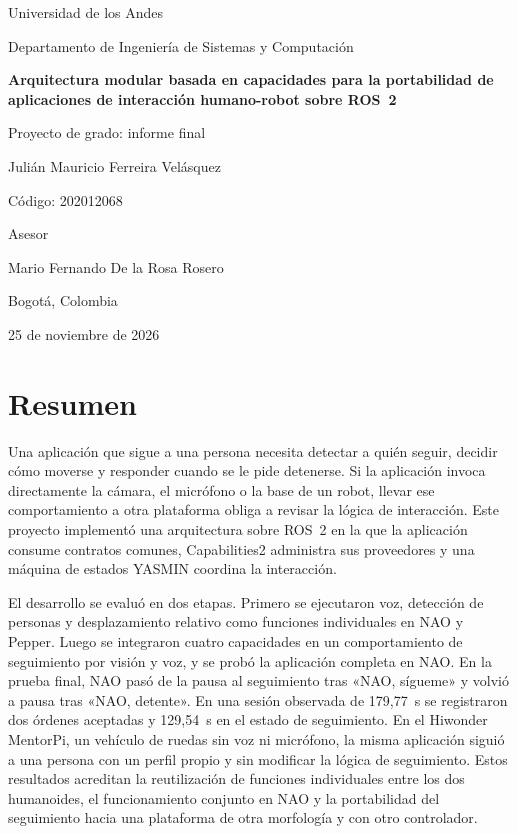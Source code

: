 \documentclass[11pt,letterpaper]{article}
\begin{document}
\hypersetup{pageanchor=false}
\begin{titlepage}
\centering
{\Large Universidad de los Andes\par}
Departamento de Ingeniería de Sistemas y Computación\par
\vspace{2cm}
{\LARGE\bfseries Arquitectura modular basada en capacidades para la portabilidad de aplicaciones de interacción humano-robot sobre ROS~2\par}
\vspace{1.2cm}
{\Large Proyecto de grado: informe final\par}
\vspace{1.5cm}
{\large Julián Mauricio Ferreira Velásquez\par}
Código: 202012068\par
\vspace{1cm}
Asesor\par
{\large Mario Fernando De la Rosa Rosero\par}
\vfill
Bogotá, Colombia\par
25 de noviembre de 2026\par
\end{titlepage}

\hypersetup{pageanchor=true}
\tableofcontents
\clearpage
\listoffigures
\listoftables
\clearpage
{}
\setcounter{section}{-1}

\section{Resumen}
Una aplicación que sigue a una persona necesita detectar a quién seguir, decidir cómo moverse y responder cuando se le pide detenerse. Si la aplicación invoca directamente la cámara, el micrófono o la base de un robot, llevar ese comportamiento a otra plataforma obliga a revisar la lógica de interacción. Este proyecto implementó una arquitectura sobre ROS~2 en la que la aplicación consume contratos comunes, Capabilities2 administra sus proveedores y una máquina de estados YASMIN coordina la interacción.

El desarrollo se evaluó en dos etapas. Primero se ejecutaron voz, detección de personas y desplazamiento relativo como funciones individuales en NAO y Pepper. Luego se integraron cuatro capacidades en un comportamiento de seguimiento por visión y voz, y se probó la aplicación completa en NAO. En la prueba final, NAO pasó de la pausa al seguimiento tras «NAO, sígueme» y volvió a pausa tras «NAO, detente». En una sesión observada de 179,77~s se registraron dos órdenes aceptadas y 129,54~s en el estado de seguimiento. En el Hiwonder MentorPi, un vehículo de ruedas sin voz ni micrófono, la misma aplicación siguió a una persona con un perfil propio y sin modificar la lógica de seguimiento. Estos resultados acreditan la reutilización de funciones individuales entre los dos humanoides, el funcionamiento conjunto en NAO y la portabilidad del seguimiento hacia una plataforma de otra morfología y con otro controlador.
\end{document}
